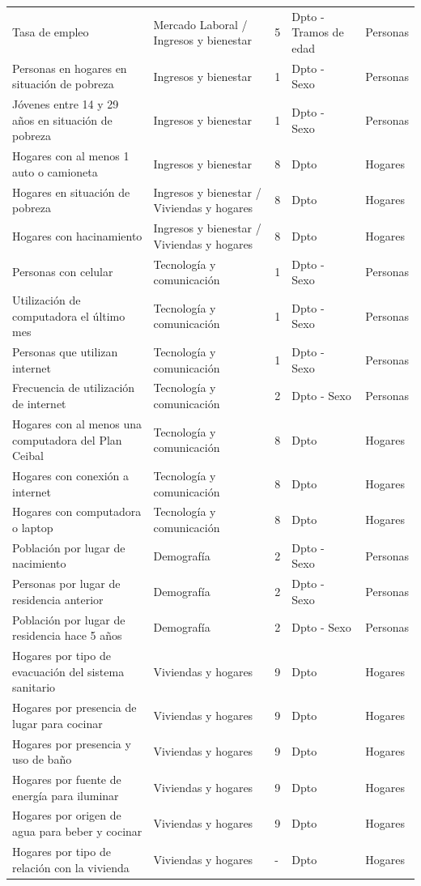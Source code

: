 \documentclass[12pt,twoside,spanish,a4paper]{book}\usepackage[]{graphicx}\usepackage[]{color}
\begin{document}
\begin{appendix}
\begin{longtable}{p{2in}|p{1in}|p{0.5in}|p{1in}|p{0.5in}}
  Tasa de empleo & Mercado Laboral / Ingresos y bienestar & 5 & Dpto - Tramos de edad  & Personas \\ 
  Personas en hogares en situación de pobreza & Ingresos y bienestar & 1 & Dpto - Sexo  & Personas \\ 
  Jóvenes entre 14 y 29 años en situación de pobreza & Ingresos y bienestar & 1 & Dpto - Sexo  & Personas \\ 
  Hogares con al menos 1 auto o camioneta & Ingresos y bienestar & 8 & Dpto  & Hogares \\ 
  Hogares en situación de pobreza & Ingresos y bienestar / Viviendas y hogares & 8 & Dpto  & Hogares \\ 
  Hogares con hacinamiento & Ingresos y bienestar / Viviendas y hogares & 8 & Dpto  & Hogares \\ 
  Personas con celular & Tecnología y comunicación & 1 & Dpto - Sexo  & Personas \\ 
  Utilización de computadora el último mes & Tecnología y comunicación & 1 & Dpto - Sexo  & Personas \\ 
  Personas que utilizan internet  & Tecnología y comunicación & 1 & Dpto - Sexo  & Personas \\ 
  Frecuencia de utilización de internet & Tecnología y comunicación & 2 & Dpto - Sexo & Personas \\ 
  Hogares con al menos una computadora del Plan Ceibal & Tecnología y comunicación & 8 & Dpto  & Hogares \\ 
  Hogares con conexión a internet & Tecnología y comunicación & 8 & Dpto  & Hogares \\ 
  Hogares con computadora o laptop & Tecnología y comunicación & 8 & Dpto  & Hogares \\ 
  Población por lugar de nacimiento & Demografía & 2 & Dpto - Sexo  & Personas \\ 
  Personas por lugar de residencia anterior & Demografía & 2 & Dpto - Sexo  & Personas \\ 
  Población por lugar de residencia hace 5 años & Demografía & 2 & Dpto - Sexo & Personas \\ 
  Hogares por tipo de evacuación del sistema sanitario & Viviendas y hogares & 9 & Dpto  & Hogares \\ 
  Hogares por presencia de lugar para cocinar & Viviendas y hogares & 9 & Dpto  & Hogares \\ 
  Hogares por presencia y uso de baño & Viviendas y hogares & 9 & Dpto  & Hogares \\ 
  Hogares por fuente de energía para iluminar & Viviendas y hogares & 9 & Dpto  & Hogares \\ 
  Hogares por origen de agua para beber y cocinar & Viviendas y hogares & 9 & Dpto  & Hogares \\ 
  Hogares por tipo de relación con la vivienda & Viviendas y hogares & - & Dpto & Hogares \\ 
  \hline
\end{longtable}




\end{appendix}
\end{document}
